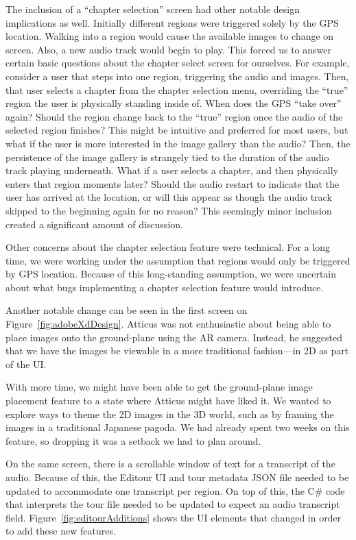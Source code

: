\documentclass[a4paper, 10pt, american, titlepage]{article}
\begin{document}
The inclusion of a ``chapter selection'' screen had other notable design
implications as well. Initially different regions were triggered solely by the
GPS location. Walking into a region would cause the available images to change
on screen. Also, a new audio track would begin to play. This forced us to answer
certain basic questions about the chapter select screen for ourselves. For
example, consider a user that steps into one region, triggering the audio and
images. Then, that user selects a chapter from the chapter selection menu,
overriding the ``true'' region the user is physically standing inside of. When
does the GPS ``take over'' again? Should the region change back to the ``true''
region once the audio of the selected region finishes? This might be intuitive
and preferred for most users, but what if the user is more interested in the
image gallery than the audio? Then, the persistence of the image gallery is
strangely tied to the duration of the audio track playing underneath. What if a
user selects a chapter, and then physically enters that region moments later?
Should the audio restart to indicate that the user has arrived at the location,
or will this appear as though the audio track skipped to the beginning again for
no reason? This seemingly minor inclusion created a significant amount of
discussion.

Other concerns about the chapter selection feature were technical. For a long
time, we were working under the assumption that regions would only be triggered
by GPS location. Because of this long-standing assumption, we were uncertain
about what bugs implementing a chapter selection feature would introduce.

Another notable change can be seen in the first screen on
Figure~\ref{fig:adobeXdDesign}. Atticus was not enthusiastic about being able
to place images onto the ground-plane using the AR camera. Instead, he
suggested that we have the images be viewable in a more traditional
fashion---in 2D as part of the UI.

With more time, we might have been able to get the ground-plane image placement
feature to a state where Atticus might have liked it. We wanted to explore ways
to theme the 2D images in the 3D world, such as by framing the images in a
traditional Japanese pagoda. We had already spent two weeks on this feature, so
dropping it was a setback we had to plan around.

On the same screen, there is a scrollable window of text for a transcript of
the audio. Because of this, the Editour UI and tour metadata JSON file needed
to be updated to accommodate one transcript per region. On top of this, the C\#
code that interprets the tour file needed to be updated to expect an audio
transcript field.  Figure~\ref{fig:editourAdditions} shows the UI elements that
changed in order to add these new features.
\end{document}
